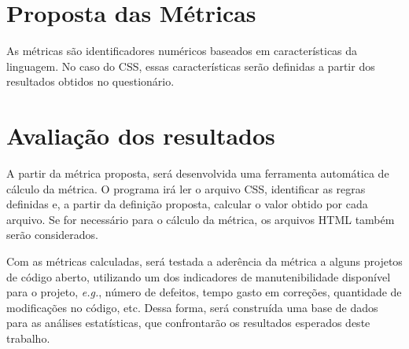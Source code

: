 \section{Proposta das Métricas}

As métricas são identificadores numéricos baseados em características da linguagem. No caso do CSS, essas características serão definidas a partir dos resultados obtidos no questionário.

\section{Avaliação dos resultados}

A partir da métrica proposta, será desenvolvida uma ferramenta automática de cálculo da métrica. O programa irá ler o arquivo CSS, identificar as regras definidas e, a partir da definição proposta, calcular o valor obtido por cada arquivo. Se for necessário para o cálculo da métrica, os arquivos HTML também serão considerados.

Com as métricas calculadas, será testada a aderência da métrica a alguns projetos de código aberto, utilizando um dos indicadores de manutenibilidade disponível para o projeto, \textit{e.g.}, número de defeitos, tempo gasto em correções, quantidade de modificações no código, etc. Dessa forma, será construída uma base de dados para as análises estatísticas, que confrontarão os resultados esperados deste trabalho.
